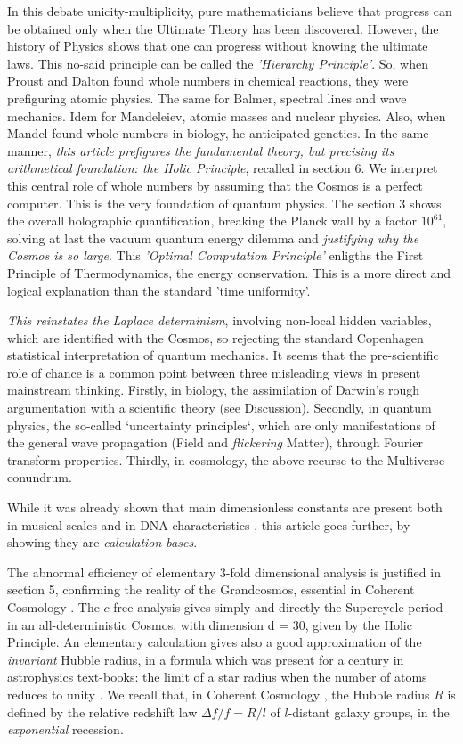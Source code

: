 \documentclass[twoside,draft]{article}
\begin{document}
\begin{sloppypar}
In this debate unicity-multiplicity, pure mathematicians believe that progress can be obtained only when the Ultimate Theory has been discovered. However, the history of Physics shows that one can progress without knowing the ultimate laws. This no-said principle can be called the \textit{'Hierarchy Principle'}. So, when Proust and Dalton found whole numbers in chemical reactions, they were prefiguring atomic physics. The same for Balmer, spectral lines and wave mechanics. Idem for Mandeleiev, atomic masses and nuclear physics. Also, when Mandel found whole numbers in biology, he anticipated genetics. In the same manner, \textit{this article prefigures the fundamental theory, but precising its arithmetical foundation: the Holic Principle}, recalled in section 6. We interpret this central role of whole numbers by assuming that the Cosmos is a perfect computer. This is the very foundation of quantum physics. The section 3 shows the overall holographic quantification, breaking the Planck wall by a factor $10^{61}$, solving at last the vacuum quantum energy dilemma and \textit{justifying why the Cosmos is so large}.
This \textit{'Optimal Computation Principle'} enligths the First Principle of Thermodynamics, the energy conservation. This is a more direct and logical explanation than the standard 'time uniformity'. 

\textit{This reinstates the Laplace determinism}, involving non-local hidden variables, which are identified with the Cosmos, so rejecting the standard Copenhagen statistical interpretation of quantum mechanics. It seems that the pre-scientific role of chance is a common point between three misleading views in present mainstream thinking. Firstly, in biology, the assimilation of Darwin's rough argumentation with a scientific theory (see Discussion). Secondly, in quantum physics, the so-called `uncertainty principles`, which are only manifestations of the general wave propagation (Field and \textit{flickering} Matter), through Fourier transform properties. Thirdly, in cosmology, the above recurse to the Multiverse conundrum.

While it was already shown that main dimensionless constants are present both in musical scales and in DNA characteristics \cite{Sanchez1}, this article goes further, by showing they are \textit{calculation bases}.

The abnormal efficiency of elementary 3-fold dimensional analysis is justified in section 5, confirming the reality of the Grandcosmos, essential in Coherent Cosmology \cite{Sanchez1}. The $c$-free analysis gives simply and directly the Supercycle period in an all-deterministic Cosmos, with dimension d = 30, given by the Holic Principle. An elementary calculation gives also a good approximation of the \textit{invariant} Hubble radius, in a formula which was present for a century in astrophysics text-books: the limit of a star radius when the number of atoms reduces to unity \cite{Sanchez1}. We recall that, in Coherent Cosmology \cite{Sanchez1}, the Hubble radius $R$ is defined by the relative redshift law $\Delta f/f = R/l$ of $l$-distant galaxy groups, in the \textit{exponential} recession.


\end{sloppypar}
\end{document}
